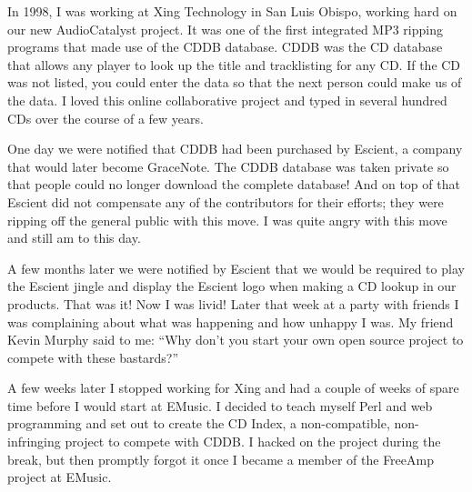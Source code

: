 


In 1998, I was working at Xing Technology in San Luis Obispo, working hard on
our new AudioCatalyst project. It was one of the first integrated MP3 ripping
programs that made use of the CDDB database. CDDB was the CD database that
allows any player to look up the title and tracklisting for any CD. If the CD
was not listed, you could enter the data so that the next person could make us
of the data. I loved this online collaborative project and typed in several
hundred CDs over the course of a few years.

One day we were notified that CDDB had been purchased by Escient, a company that
would later become GraceNote. The CDDB database was taken private so that people
could no longer download the complete database! And on top of that Escient did
not compensate any of the contributors for their efforts; they were ripping off
the general public with this move. I was quite angry with this move and still am
to this day.

A few months later we were notified by Escient that we would be required to play
the Escient jingle and display the Escient logo when making a CD lookup in our
products. That was it! Now I was livid! Later that week at a party with friends
I was complaining about what was happening and how unhappy I was. My friend
Kevin Murphy said to me: ``Why don’t you start your own open source project to
compete with these bastards?''

A few weeks later I stopped working for Xing and had a couple of weeks of spare
time before I would start at EMusic. I decided to teach myself Perl and web
programming and set out to create the CD Index, a non-compatible, non-infringing
project to compete with CDDB. I hacked on the project during the break, but then
promptly forgot it once I became a member of the FreeAmp project at EMusic.

